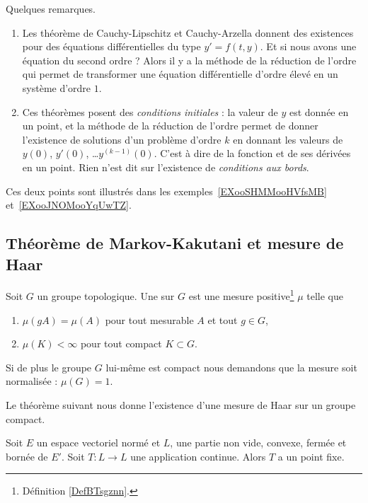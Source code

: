 \begin{remark}
    Quelques remarques.
    \begin{enumerate}
        \item
    Les théorème de Cauchy-Lipschitz et Cauchy-Arzella donnent des existences pour des équations différentielles du type \( y'=f(t,y)\). Et si nous avons une équation du second ordre ? Alors il y a la méthode de la réduction de l'ordre qui permet de transformer une équation différentielle d'ordre élevé en un système d'ordre \( 1\).
\item
    Ces théorèmes posent des \emph{conditions initiales} : la valeur de \( y\) est donnée en un point, et la méthode de la réduction de l'ordre permet de donner l'existence de solutions d'un problème d'ordre \( k\) en donnant les valeurs de \( y(0)\), \( y'(0)\), \ldots \( y^{(k-1)}(0)\). C'est à dire de la fonction et de ses dérivées en un point. Rien n'est dit sur l'existence de \emph{conditions aux bords}.
    \end{enumerate}
    Ces deux points sont illustrés dans les exemples~\ref{EXooSHMMooHVfsMB} et~\ref{EXooJNOMooYqUwTZ}.
\end{remark}

\subsection{Théorème de Markov-Kakutani et mesure de Haar}

\begin{definition}
    Soit \( G\) un groupe topologique. Une  sur \( G\) est une mesure positive\footnote{Définition \ref{DefBTsgznn}.} \( \mu\) telle que
    \begin{enumerate}
        \item
            \( \mu(gA)=\mu(A)\) pour tout mesurable \( A\) et tout \( g\in G\),
        \item
            \( \mu(K)<\infty\) pour tout compact \( K\subset G\).
    \end{enumerate}
    Si de plus le groupe \( G\) lui-même est compact nous demandons que la mesure soit normalisée : \( \mu(G)=1\).
\end{definition}

Le théorème suivant nous donne l'existence d'une mesure de Haar sur un groupe compact.
\begin{theorem}   \label{ThoeJCdMP}
    Soit \( E\) un espace vectoriel normé et \( L\), une partie non vide, convexe, fermée et bornée de \( E'\). Soit \( T\colon L\to L\) une application continue. Alors \( T\) a un point fixe.
\end{theorem}

